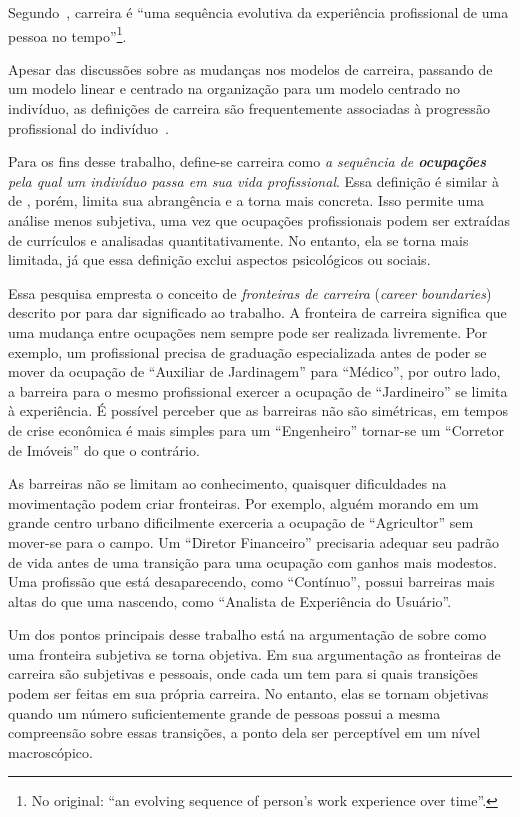 \documentclass[
  article,
  11pt,
  a4paper,
  english,
  brazil,
  sumario=tradicional]{abntex2}
\begin{document}
Segundo~, carreira é \foreignquote{english}{uma sequência evolutiva da experiência profissional de uma pessoa no tempo}\footnote{No original: \enquote{an evolving sequence of person's work experience over time}.}.

Apesar das discussões sobre as mudanças nos modelos de carreira, passando de um modelo linear e centrado na organização para um modelo centrado no indivíduo, as definições de carreira são frequentemente associadas à progressão profissional do indivíduo~\cite{Baruch2004-oy,Sullivan2009-xb,Bendassolli2009-bg}.

Para os fins desse trabalho, define-se carreira como \textit{a sequência de \textbf{ocupações} pela qual um indivíduo passa em sua vida profissional}. Essa definição é similar à de , porém, limita sua abrangência e a torna mais concreta. Isso permite uma análise menos subjetiva, uma vez que ocupações profissionais podem ser extraídas de currículos e analisadas quantitativamente. No entanto, ela se torna mais limitada, já que essa definição exclui aspectos psicológicos ou sociais.

Essa pesquisa empresta o conceito de \textit{fronteiras de carreira} (\textit{career boundaries}) descrito por  para dar significado ao trabalho. A fronteira de carreira significa que uma mudança entre ocupações nem sempre pode ser realizada livremente. Por exemplo, um profissional precisa de graduação especializada antes de poder se mover da ocupação de \enquote{Auxiliar de Jardinagem} para \enquote{Médico}, por outro lado, a barreira para o mesmo profissional exercer a ocupação de \enquote{Jardineiro} se limita à experiência. É possível perceber que as barreiras não são simétricas, em tempos de crise econômica é mais simples para um \enquote{Engenheiro} tornar-se um \enquote{Corretor de Imóveis} do que o contrário.

As barreiras não se limitam ao conhecimento, quaisquer dificuldades na movimentação podem criar fronteiras. Por exemplo, alguém morando em um grande centro urbano dificilmente exerceria a ocupação de \enquote{Agricultor} sem mover-se para o campo. Um \enquote{Diretor Financeiro} precisaria adequar seu padrão de vida antes de uma transição para uma ocupação com ganhos mais modestos. Uma profissão que está desaparecendo, como \enquote{Contínuo}, possui barreiras mais altas do que uma nascendo, como \enquote{Analista de Experiência do Usuário}.

Um dos pontos principais desse trabalho está na argumentação de  sobre como uma fronteira subjetiva se torna objetiva. Em sua argumentação as fronteiras de carreira são subjetivas e pessoais, onde cada um tem para si quais transições podem ser feitas em sua própria carreira. No entanto, elas se tornam objetivas quando um número suficientemente grande de pessoas possui a mesma compreensão sobre essas transições, a ponto dela ser perceptível em um nível macroscópico.
\end{document}
